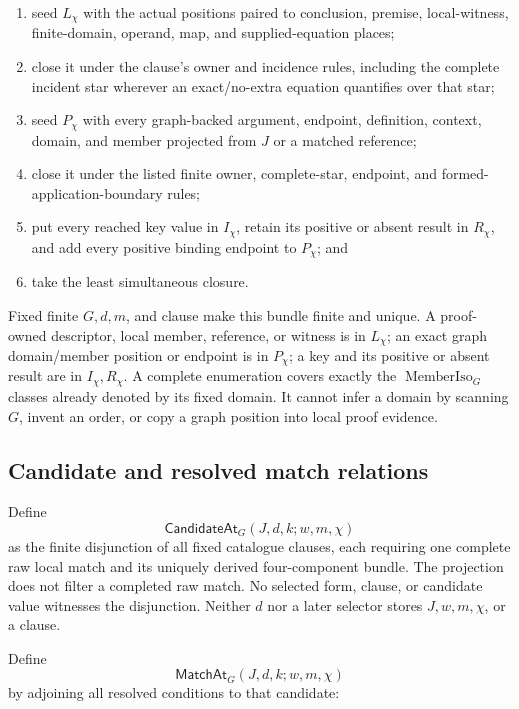 \documentclass[11pt,twoside]{article}
\newcommand{\CandidateAt}{\mathsf{CandidateAt}}
\newcommand{\MatchAt}{\mathsf{MatchAt}}
\begin{document}
\begin{enumerate}[leftmargin=2.2em]
  \item seed \(L_\chi\) with the actual positions paired to conclusion, premise,
        local-witness, finite-domain, operand, map, and supplied-equation places;
  \item close it under the clause's owner and incidence rules, including the
        complete incident star wherever an exact/no-extra equation quantifies over
        that star;
  \item seed \(P_\chi\) with every graph-backed argument, endpoint, definition,
        context, domain, and member projected from \(J\) or a matched reference;
  \item close it under the listed finite owner, complete-star, endpoint, and
        formed-application-boundary rules;
  \item put every reached key value in \(I_\chi\), retain its positive or absent
        result in \(R_\chi\), and add every positive binding endpoint to
        \(P_\chi\); and
  \item take the least simultaneous closure.
\end{enumerate}

Fixed finite \(G,d,m\), and clause make this bundle finite and unique.  A
proof-owned descriptor, local member, reference, or witness is in \(L_\chi\); an
exact graph domain/member position or endpoint is in \(P_\chi\); a key and its
positive or absent result are in \(I_\chi,R_\chi\).  A complete enumeration covers
exactly the \(\operatorname{MemberIso}_G\) classes already denoted by its fixed
domain.  It cannot infer a domain by scanning \(G\), invent an order, or copy a
graph position into local proof evidence.

\subsection{Candidate and resolved match relations}

Define
\[
  \CandidateAt_G(J,d,k;w,m,\chi)
\]
as the finite disjunction of all fixed catalogue clauses, each requiring one
complete raw local match and its uniquely derived four-component bundle.  The
projection does not filter a completed raw match.  No selected form, clause, or
candidate value witnesses the disjunction.  Neither \(d\) nor a later selector
stores \(J,w,m,\chi\), or a clause.

Define
\[
  \MatchAt_G(J,d,k;w,m,\chi)
\]
by adjoining all resolved conditions to that candidate:
\end{document}
